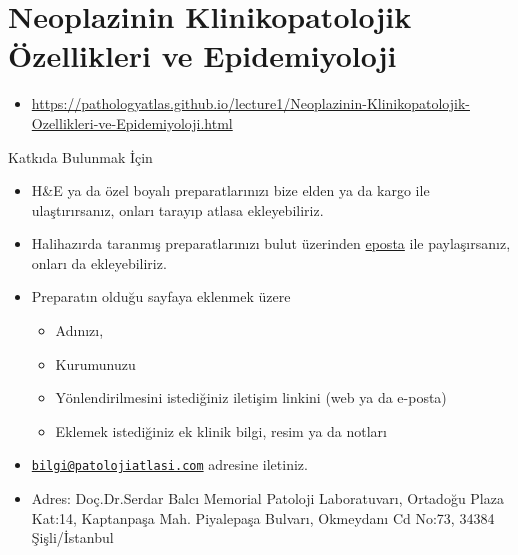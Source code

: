\documentclass[
  letterpaper,
  DIV=11,
  numbers=noendperiod]{scrreprt}
\providecommand{\tightlist}{%
  \setlength{\itemsep}{0pt}\setlength{\parskip}{0pt}}
\begin{document}
\hypertarget{neoplazinin-klinikopatolojik-uxf6zellikleri-ve-epidemiyoloji}{%
\chapter{Neoplazinin Klinikopatolojik Özellikleri ve
Epidemiyoloji}\label{neoplazinin-klinikopatolojik-uxf6zellikleri-ve-epidemiyoloji}}

\begin{itemize}
\tightlist
\item
  \url{https://pathologyatlas.github.io/lecture1/Neoplazinin-Klinikopatolojik-Ozellikleri-ve-Epidemiyoloji.html}
\end{itemize}

Katkıda Bulunmak İçin

\begin{itemize}
\item
  H\&E ya da özel boyalı preparatlarınızı bize elden ya da kargo ile
  ulaştırırsanız, onları tarayıp atlasa ekleyebiliriz.
\item
  Halihazırda taranmış preparatlarınızı bulut üzerinden
  \href{mailto:bilgi@patolojiatlasi.com}{eposta} ile paylaşırsanız,
  onları da ekleyebiliriz.
\item
  Preparatın olduğu sayfaya eklenmek üzere

  \begin{itemize}
  \item
    Adınızı,
  \item
    Kurumunuzu
  \item
    Yönlendirilmesini istediğiniz iletişim linkini (web ya da e-posta)
  \item
    Eklemek istediğiniz ek klinik bilgi, resim ya da notları
  \end{itemize}
\item
  \href{mailto:bilgi@patolojiatlasi.com}{\nolinkurl{bilgi@patolojiatlasi.com}}
  adresine iletiniz.
\item
  Adres: Doç.Dr.Serdar Balcı Memorial Patoloji Laboratuvarı, Ortadoğu
  Plaza Kat:14, Kaptanpaşa Mah. Piyalepaşa Bulvarı, Okmeydanı Cd No:73,
  34384 Şişli/İstanbul
\end{itemize}
\end{document}
